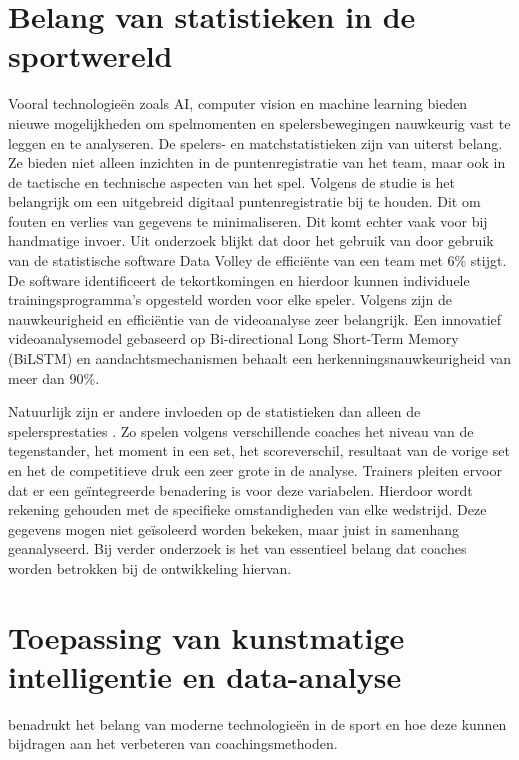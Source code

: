\section{Belang van statistieken in de sportwereld}
Vooral technologieën zoals AI, computer vision en machine learning bieden nieuwe mogelijkheden om spelmomenten en spelersbewegingen nauwkeurig vast te leggen en te analyseren. De spelers- en matchstatistieken \autocite{Wahyuti2023} zijn van uiterst belang. Ze bieden niet alleen inzichten in de puntenregistratie van het team, maar ook in de tactische en technische aspecten van het spel. Volgens de studie is het belangrijk om een uitgebreid digitaal puntenregistratie bij te houden. Dit om fouten en verlies van gegevens te minimaliseren. Dit komt echter vaak voor bij handmatige invoer. Uit onderzoek \autocite{Harabagiu2023} blijkt dat door het gebruik van door gebruik van de statistische software Data Volley de efficiënte van een team met 6\% stijgt. De software identificeert de tekortkomingen en hierdoor kunnen individuele trainingsprogramma's opgesteld worden voor elke speler. Volgens \textcite{Ruiye2024} zijn de nauwkeurigheid en efficiëntie van de videoanalyse zeer belangrijk. Een innovatief videoanalysemodel gebaseerd op Bi-directional Long Short-Term Memory (BiLSTM) en aandachtsmechanismen behaalt een herkenningsnauwkeurigheid van meer dan 90\%.

Natuurlijk zijn er andere invloeden op de statistieken dan alleen de spelersprestaties \autocite{LopezSerrano2022}. Zo spelen volgens verschillende coaches het niveau van de tegenstander, het moment in een set, het scoreverschil, resultaat van de vorige set en het de competitieve druk een zeer grote in de analyse. Trainers pleiten ervoor dat er een geïntegreerde benadering is voor deze variabelen. Hierdoor wordt rekening gehouden met de specifieke omstandigheden van elke wedstrijd. Deze gegevens mogen niet geïsoleerd worden bekeken, maar juist in samenhang geanalyseerd. Bij verder onderzoek is het van essentieel belang dat coaches worden betrokken bij de ontwikkeling hiervan.

\section{Toepassing van kunstmatige intelligentie en data-analyse}
\textcite{Fadl2020} benadrukt het belang van moderne technologieën in de sport en hoe deze kunnen bijdragen aan het verbeteren van coachingsmethoden.


